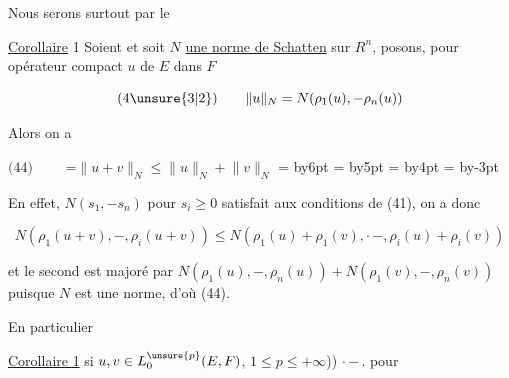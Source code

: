 Nous serons surtout  par le

\uline{Corollaire} 1 Soient  et soit $N$ \uline{une norme de Schatten} sur $R^n$,  posons, pour  opérateur compact $u$ de $E$ dans $F$

\[
\text{(4\unsure{3|2})}\qquad
\lVert u\rVert_N=N(\rho_1(u),\mathord{-}\rho_n(u))
\]

Alors on a

\begin{center}
\(\text{(44)}\qquad\)
\begingroup
{}=\hbox{$\lVert u+v\rVert_N\leq\lVert u\rVert_N+\lVert v\rVert_N$}
=\advance{} by6pt
=\advance{} by5pt
=\advance{} by4pt
=\advance{} by-3pt
\leavevmode\hspace{3pt}
\hspace{6pt}
\endgroup
\end{center}


En effet, $N(s_1,\mathord{-}s_n)$ pour $s_i\geq0$ satisfait aux conditions de (41), on a donc

\[
N(\rho_1(u+v),\mathord{-},\rho_i(u+v))\leq
N(\rho_1(u)+\rho_1(v),\mathord{\cdot}\,\mathord{-},\rho_i(u)+\rho_i(v))
\]

et le second  est majoré par $N(\rho_1(u),\mathord{-},\rho_n(u))+N(\rho_1(v),\mathord{-},\rho_n(v))$ puisque $N$ est une norme, d'où (44).

En particulier

\uline{Corollaire 1}  si $u,v\in L_0^{\unsure{p}}(E,F)$,   $1\leq p\leq+\infty$)) $\mathord{\cdot}\,\mathord{-}\,.$ pour  

